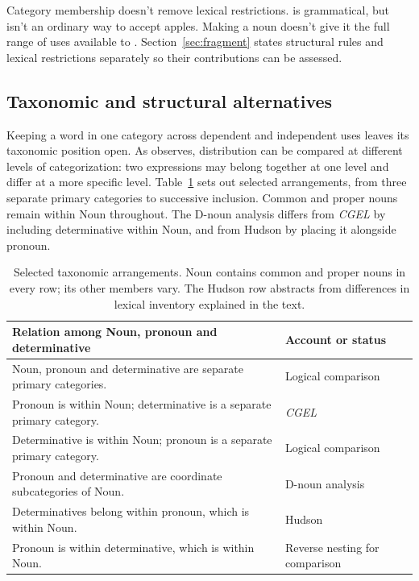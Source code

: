 \documentclass[12pt]{article}
\begin{document}
Category membership doesn't remove lexical restrictions.  is grammatical, but  isn't an ordinary way to accept apples. Making  a noun doesn't give it the full range of uses available to . Section~\ref{sec:fragment} states structural rules and lexical restrictions separately so their contributions can be assessed.

\subsection{Taxonomic and structural alternatives}\label{sec:related}

Keeping a word in one category across dependent and independent uses leaves its taxonomic position open. As \textcite[232--235]{lyons1968} observes, distribution can be compared at different levels of categorization: two expressions may belong together at one level and differ at a more specific level. Table~\ref{tab:rivals} sets out selected arrangements, from three separate primary categories to successive inclusion. Common and proper nouns remain within Noun throughout. The D-noun analysis differs from \textit{CGEL} by including determinative within Noun, and from Hudson by placing it alongside pronoun.

\begin{table}[H]
\centering\small
\caption{Selected taxonomic arrangements. Noun contains common and proper nouns in every row; its other members vary. The Hudson row abstracts from differences in lexical inventory explained in the text.}\label{tab:rivals}
\begin{tabular}{>{\raggedright\arraybackslash}p{8.7cm}>{\raggedright\arraybackslash}p{3cm}}
\toprule
Relation among Noun, pronoun and determinative & Account or status \\
\midrule
Noun, pronoun and determinative are separate primary categories. & Logical comparison \\
Pronoun is within Noun; determinative is a separate primary category. & \textit{CGEL} \\
Determinative is within Noun; pronoun is a separate primary category. & Logical comparison \\
Pronoun and determinative are coordinate subcategories of Noun. & D-noun analysis \\
Determinatives belong within pronoun, which is within Noun. & Hudson \\
Pronoun is within determinative, which is within Noun. & Reverse nesting for comparison \\
\bottomrule
\end{tabular}
\end{table}
\end{document}
